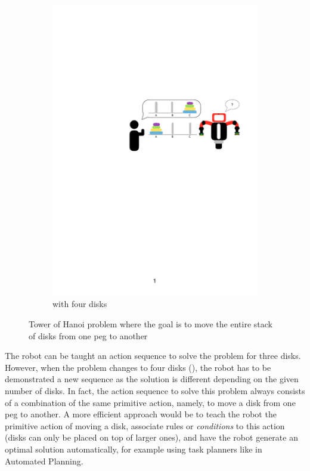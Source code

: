 \begin{figure}[htp]
\begin{subfigure}[t]{0.45\textwidth}
	\includegraphics[width=\textwidth]{figures/hanoi-1}
	\caption{with four disks}
	\label{fig:Tower of Hanoi 4}
\end{subfigure}
\caption{Tower of Hanoi problem where the goal is to move the entire stack of disks from one peg to another}
\label{fig:Tower of Hanoi}
\end{figure}

The robot can be taught an action sequence to solve the problem for three disks.
However, when the problem changes to four disks (), the robot has to be demonstrated a new sequence %
as the solution is different depending on the given number of disks.
In fact, the action sequence to solve this problem always consists of a combination of the same primitive action, namely, to move a disk from one peg to another.
A more efficient approach would be to teach the robot the primitive action of moving a disk, associate rules or \textit{conditions} to this action (\eg disks can only be placed on top of larger ones), and have the robot generate an optimal solution automatically, for example using task planners like in Automated Planning.

